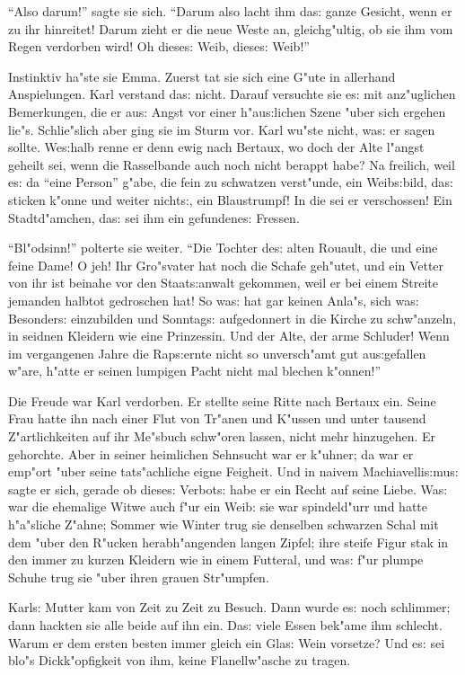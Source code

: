 \documentclass[oneside,12pt]{book}
\newcommand{\s}{s:}%
\begin{document}
"`Also darum!"' sagte sie sich. "`Darum also lacht ihm da{\s}
ganze Gesicht, wenn er zu ihr hinreitet! Darum zieht er die neue
Weste an, gleichg"ultig, ob sie ihm vom Regen verdorben wird! Oh
diese{\s} Weib, diese{\s} Weib!"'

Instinktiv ha"ste sie Emma. Zuerst tat sie sich eine G"ute in
allerhand Anspielungen. Karl verstand da{\s} nicht. Darauf
versuchte sie e{\s} mit anz"uglichen Bemerkungen, die er au{\s}
Angst vor einer h"au{\s}lichen Szene "uber sich ergehen lie"s.
Schlie"slich aber ging sie im Sturm vor. Karl wu"ste nicht, wa{\s}
er sagen sollte. We{\s}halb renne er denn ewig nach Bertaux, wo
doch der Alte l"angst geheilt sei, wenn die Rasselbande auch noch
nicht berappt habe? Na freilich, weil e{\s} da "`eine Person"'
g"abe, die fein zu schwatzen verst"unde, ein Weib{\s}bild, da{\s}
sticken k"onne und weiter nicht{\s}, ein Blaustrumpf! In die sei
er verschossen! Ein Stadtd"amchen, da{\s} sei ihm ein
gefundene{\s} Fressen.

"`Bl"odsinn!"' polterte sie weiter. "`Die Tochter de{\s} alten
Rouault, die und eine feine Dame! O jeh! Ihr Gro"svater hat noch
die Schafe geh"utet, und ein Vetter von ihr ist beinahe vor den
Staat{\s}anwalt gekommen, weil er bei einem Streite jemanden
halbtot gedroschen hat! So wa{\s} hat gar keinen Anla"s, sich
wa{\s} Besonder{\s} einzubilden und Sonntag{\s} aufgedonnert in
die Kirche zu schw"anzeln, in seidnen Kleidern wie eine
Prinzessin. Und der Alte, der arme Schluder! Wenn im vergangenen
Jahre die Rap{\s}ernte nicht so unversch"amt gut au{\s}gefallen
w"are, h"atte er seinen lumpigen Pacht nicht mal blechen
k"onnen!"'

Die Freude war Karl verdorben. Er stellte seine Ritte nach Bertaux
ein. Seine Frau hatte ihn nach einer Flut von Tr"anen und K"ussen
und unter tausend Z"artlichkeiten auf ihr Me"sbuch schw"oren
lassen, nicht mehr hinzugehen. Er gehorchte. Aber in seiner
heimlichen Sehnsucht war er k"uhner; da war er emp"ort "uber seine
tats"achliche eigne Feigheit. Und in naivem Machiavelli{\s}mu{\s}
sagte er sich, gerade ob diese{\s} Verbot{\s} habe er ein Recht
auf seine Liebe. Wa{\s} war die ehemalige Witwe auch f"ur ein
Weib: sie war spindeld"urr und hatte h"a"sliche Z"ahne; Sommer wie
Winter trug sie denselben schwarzen Schal mit dem "uber den
R"ucken herabh"angenden langen Zipfel; ihre steife Figur stak in
den immer zu kurzen Kleidern wie in einem Futteral, und wa{\s}
f"ur plumpe Schuhe trug sie "uber ihren grauen Str"umpfen.

Karl{\s} Mutter kam von Zeit zu Zeit zu Besuch. Dann wurde e{\s}
noch schlimmer; dann hackten sie alle beide auf ihn ein. Da{\s}
viele Essen bek"ame ihm schlecht. Warum er dem ersten besten immer
gleich ein Gla{\s} Wein vorsetze? Und e{\s} sei blo"s
Dickk"opfigkeit von ihm, keine Flanellw"asche zu tragen.
\end{document}
